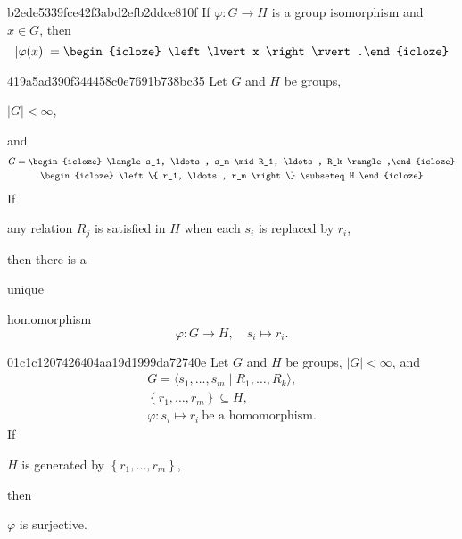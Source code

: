 \begin{note}{b2ede5339fce42f3abd2efb2ddce810f}
    If \({ \varphi : G \to H }\) is a group isomorphism and \({ x \in G }\), then
    \[
        \left\lvert \varphi(x) \right\rvert = \begin{icloze}{1}\left\lvert x \right\rvert.\end{icloze}
    \]
\end{note}

\begin{note}{419a5ad390f344458c0e7691b738bc35}
    Let \({ G }\) and \({ H }\) be groups, \begin{icloze}{6}\({ \left\lvert G \right\rvert < \infty }\),\end{icloze} and
    \[
        \begin{gathered}
            G = \begin{icloze}{3}\langle s_1, \ldots, s_m \mid R_1, \ldots, R_k \rangle,\end{icloze} \\
            \begin{icloze}{4}\left\{ r_1, \ldots, r_m \right\} \subseteq H.\end{icloze}
        \end{gathered}
    \]
    If \begin{icloze}{1}any relation \({ R_j }\) is satisfied in \({ H }\) when each \({ s_i }\) is replaced by \({ r_i }\),\end{icloze} then there is a \begin{icloze}{5}unique\end{icloze}
    \begin{icloze}{2}
        homomorphism
        \[
            \varphi : G \to H, \quad s_i \mapsto r_i.
        \]
    \end{icloze}
\end{note}

\begin{note}{01c1c1207426404aa19d1999da72740e}
    Let \({ G }\) and \({ H }\) be groups, \({ \left\lvert G \right\rvert < \infty }\), and
    \[
        \begin{gathered}
            G = \langle s_1, \ldots, s_m \mid R_1, \ldots, R_k \rangle, \\
            \left\{ r_1, \ldots, r_m \right\} \subseteq H, \\
            \varphi : s_i \mapsto r_i\ \text{be a homomorphism}.
        \end{gathered}
    \]
    If \begin{icloze}{2}\({ H }\) is generated by \({ \left\{ r_1, \ldots, r_m \right\} }\),\end{icloze} then \begin{icloze}{1}\({ \varphi }\) is surjective.\end{icloze}
\end{note}

